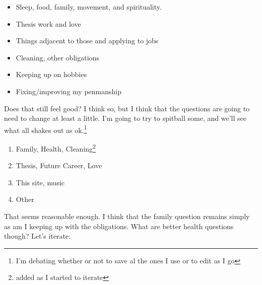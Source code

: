 \documentclass[12pt]{article}
\renewcommand{\,}{\textsuperscript{,}}
\begin{document}
\begin{itemize}

\item Sleep, food, family, movement, and spirituality.

\item Thesis work and love

\item Things adjacent to those and applying to jobs

\item Cleaning, other obligations

\item Keeping up on hobbies

\item Fixing/improving my penmanship

\end{itemize}

Does that still feel good?  
I think so, but I think that the questions are going to need to change at least a little.  
I'm going to try to spitball some, and we'll see what all shakes out as ok.\footnote{I'm debating whether or not to save al the ones I use or to edit as I go}

\begin{enumerate}

\item Family, Health, Cleaning\footnote{added as I started to iterate}

\item Thesis, Future Career, Love

\item This site, music

\item Other

\end{enumerate}

That seems reasonable enough.  
I think that the family question remains simply as am I keeping up with the obligations.  
What are better health questions though?  
Let's iterate:
\end{document}
